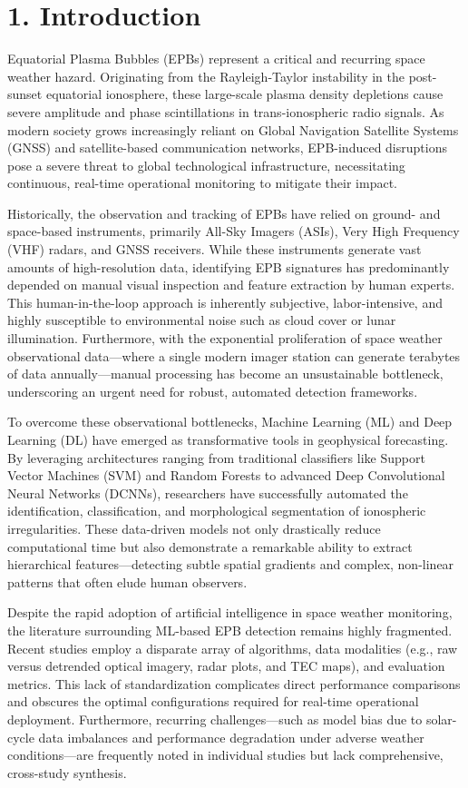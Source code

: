 \hypertarget{introduction}{%
\section{1. Introduction}\label{introduction}}

Equatorial Plasma Bubbles (EPBs) represent a critical and recurring
space weather hazard. Originating from the Rayleigh-Taylor instability
in the post-sunset equatorial ionosphere, these large-scale plasma
density depletions cause severe amplitude and phase scintillations in
trans-ionospheric radio signals. As modern society grows increasingly
reliant on Global Navigation Satellite Systems (GNSS) and
satellite-based communication networks, EPB-induced disruptions pose a
severe threat to global technological infrastructure, necessitating
continuous, real-time operational monitoring to mitigate their impact.

Historically, the observation and tracking of EPBs have relied on
ground- and space-based instruments, primarily All-Sky Imagers (ASIs),
Very High Frequency (VHF) radars, and GNSS receivers. While these
instruments generate vast amounts of high-resolution data, identifying
EPB signatures has predominantly depended on manual visual inspection
and feature extraction by human experts. This human-in-the-loop approach
is inherently subjective, labor-intensive, and highly susceptible to
environmental noise such as cloud cover or lunar illumination.
Furthermore, with the exponential proliferation of space weather
observational data---where a single modern imager station can generate
terabytes of data annually---manual processing has become an
unsustainable bottleneck, underscoring an urgent need for robust,
automated detection frameworks.

To overcome these observational bottlenecks, Machine Learning (ML) and
Deep Learning (DL) have emerged as transformative tools in geophysical
forecasting. By leveraging architectures ranging from traditional
classifiers like Support Vector Machines (SVM) and Random Forests to
advanced Deep Convolutional Neural Networks (DCNNs), researchers have
successfully automated the identification, classification, and
morphological segmentation of ionospheric irregularities. These
data-driven models not only drastically reduce computational time but
also demonstrate a remarkable ability to extract hierarchical
features---detecting subtle spatial gradients and complex, non-linear
patterns that often elude human observers.

Despite the rapid adoption of artificial intelligence in space weather
monitoring, the literature surrounding ML-based EPB detection remains
highly fragmented. Recent studies employ a disparate array of
algorithms, data modalities (e.g., raw versus detrended optical imagery,
radar plots, and TEC maps), and evaluation metrics. This lack of
standardization complicates direct performance comparisons and obscures
the optimal configurations required for real-time operational
deployment. Furthermore, recurring challenges---such as model bias due
to solar-cycle data imbalances and performance degradation under adverse
weather conditions---are frequently noted in individual studies but lack
comprehensive, cross-study synthesis.

